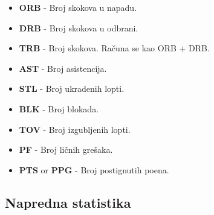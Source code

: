 \documentclass[a4paper]{article}
\begin{document}
\begin{itemize}
    \item \textbf{ORB} - Broj skokova u napadu.
    \item \textbf{DRB} - Broj skokova u odbrani.
    \item \textbf{TRB} - Broj skokova. Računa se kao ORB + DRB.
    \item \textbf{AST} - Broj asistencija.
    \item \textbf{STL} - Broj ukradenih lopti.
    \item \textbf{BLK} - Broj blokada.
    \item \textbf{TOV} - Broj izgubljenih lopti.
    \item \textbf{PF} - Broj ličnih grešaka.
    \item \textbf{PTS} or \textbf{PPG} - Broj postignutih poena.
\end{itemize}	

\subsection{Napredna statistika}
\label{subsec:napr_stat}
\end{document}
